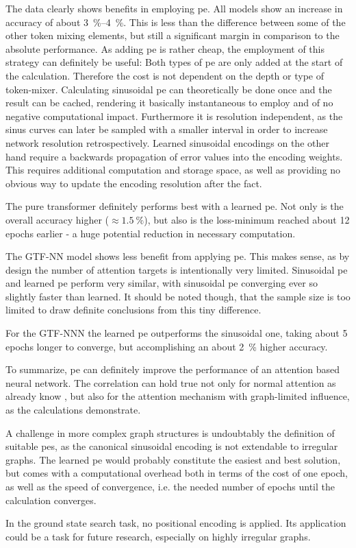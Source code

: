 The data clearly shows benefits in employing pe. 
All models show an increase in accuracy of about \SIrange[]{3}{4}{\percent}. 
This is less than the difference between some of the other token mixing elements, but still a significant margin in comparison to the absolute performance.
As adding pe is rather cheap, the employment of this strategy can definitely be useful:
Both types of pe are only added at the start of the calculation.
Therefore the cost is not dependent on the depth or type of token-mixer.
Calculating sinusoidal pe can theoretically be done once and the result can be cached, rendering it basically instantaneous to employ and of no negative computational impact. Furthermore it is resolution independent, as the sinus curves can later be sampled with a smaller interval in order to increase network resolution retrospectively.
Learned sinusoidal encodings on the other hand require a backwards propagation of error values into the encoding weights.
This requires additional computation and storage space, as well as providing no obvious way to update the encoding resolution after the fact.

The pure transformer definitely performs best with a learned pe. 
Not only is the overall accuracy higher ($\approx \SI[]{1.5}[]{\percent}$), but also is the loss-minimum reached about 12 epochs earlier - a huge potential reduction in necessary computation.

The GTF-NN model shows less benefit from applying pe.
This makes sense, as by design the number of attention targets is intentionally very limited. 
Sinusoidal pe and learned pe perform very similar, with sinusoidal pe converging ever so slightly faster than learned.
It should be noted though, that the sample size is too limited to draw definite conclusions from this tiny difference.

For the GTF-NNN the learned pe outperforms the sinusoidal one, taking about 5 epochs longer to converge, but accomplishing an about \SI[]{2}{\percent} higher accuracy.

To summarize, pe can definitely improve the performance of an attention based neural network. 
The correlation can hold true not only for normal attention as already know \cite{attentionIsAllYouNeed, imageWorth16x16}, but also for the attention mechanism with graph-limited influence, as the calculations demonstrate.

A challenge in more complex graph structures is undoubtably the definition of suitable pes, as the canonical sinusoidal encoding is not  extendable to irregular graphs.
The learned pe would probably constitute the easiest and best solution, but comes with a computational overhead both in terms of the cost of one epoch, as well as the speed of convergence, i.e. the needed number of epochs until the calculation converges.

In the ground state search task, no positional encoding is applied. 
Its application could be a task for future research, especially on highly irregular graphs.